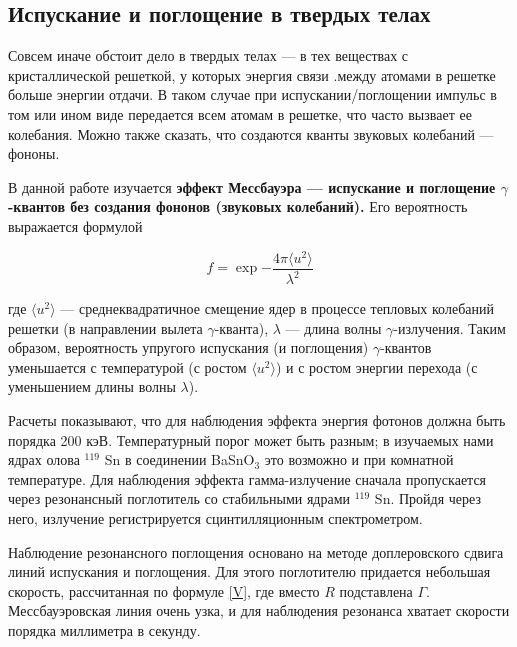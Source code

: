 \documentclass[12pt]{kiarticle}
\begin{document}
	\subsection{Испускание и поглощение в твердых телах}
	
	Совсем иначе обстоит дело в твердых телах --- в тех веществах с кристаллической решеткой, у которых энергия связи .между атомами в решетке больше энергии отдачи. В таком случае при испускании/поглощении импульс  в том или ином виде передается всем атомам в решетке, что часто вызвает ее колебания. Можно также сказать, что создаются кванты звуковых колебаний --- фононы. 
	
	В данной работе изучается \textbf{эффект Мессбауэра --- испускание и поглощение $ \gamma $-квантов без создания фононов (звуковых колебаний).} Его вероятность выражается формулой 
	
	\begin{equation}\label{}
	f = \exp{-\dfrac{4\pi \langle u^2 \rangle}{\lambda^2}}
	\end{equation}
	
	где $ \langle u^2 \rangle $ --- среднеквадратичное смещение ядер в процессе тепловых колебаний решетки (в направлении вылета $ \gamma $-кванта), $ \lambda $ --- длина волны $ \gamma $-излучения. Таким образом, вероятность упругого испускания (и поглощения) $ \gamma $-квантов уменьшается с температурой (с ростом $  \langle u^2 \rangle $) и с ростом энергии перехода (с уменьшением длины волны $ \lambda $).
	
	Расчеты показывают, что для наблюдения эффекта энергия фотонов должна быть порядка 200 кэВ. Температурный порог может быть разным; в изучаемых нами ядрах олова $ ^{119} $ Sn в соединении BaSnO$_3$ это возможно и при комнатной температуре. Для наблюдения эффекта гамма-излучение сначала пропускается через резонансный поглотитель со стабильными ядрами $ ^{119} $ Sn. Пройдя через него, излучение регистрируется сцинтилляционным спектрометром.  
	
	Наблюдение резонансного поглощения основано на методе доплеровского сдвига линий испускания и поглощения. Для этого поглотителю придается небольшая скорость, рассчитанная по формуле \eqref{V}, где вместо $ R $ подставлена $ \Gamma $. Мессбауэровская линия очень узка, и для наблюдения резонанса хватает скорости порядка миллиметра в секунду. 
	
\end{document}
